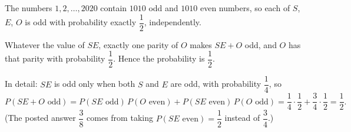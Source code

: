 The numbers $1,2,\dots,2020$ contain $1010$ odd and $1010$ even numbers, so each of $S$, $E$, $O$ is odd with probability exactly $\dfrac{1}{2}$, independently.

Whatever the value of $SE$, exactly one parity of $O$ makes $SE+O$ odd, and $O$ has that parity with probability $\dfrac{1}{2}$. Hence the probability is $\boxed{\dfrac{1}{2}}$.

In detail: $SE$ is odd only when both $S$ and $E$ are odd, with probability $\dfrac{1}{4}$, so
\[P(SE+O\text{ odd})=P(SE\text{ odd})\,P(O\text{ even})+P(SE\text{ even})\,P(O\text{ odd})=\dfrac{1}{4}\cdot\dfrac{1}{2}+\dfrac{3}{4}\cdot\dfrac{1}{2}=\dfrac{1}{2} .\]
(The posted answer $\dfrac{3}{8}$ comes from taking $P(SE\text{ even})=\dfrac{1}{2}$ instead of $\dfrac{3}{4}$.)
